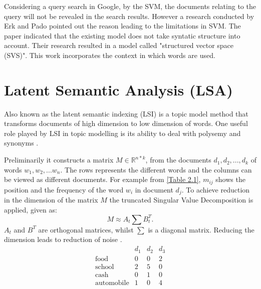 Considering a query search in Google, by the SVM, the documents relating to the query will not be revealed in the search results. However a research conducted by Erk and Pado pointed out the reason leading to the limitations in SVM.
The paper indicated that the existing model does not take syntatic structure into account. Their research resulted in a model called "structured vector space (SVS)". This work incorporates the context in which words are used.
%

\section{Latent Semantic Analysis (LSA)}
\begin{flushleft}
Also known as the latent semantic indexing (LSI) is a topic model method
that transforms documents of high dimension to low dimension of words. One useful role played by LSI in topic modelling is its ability to deal with polysemy and synonyms \cite{deerwester1990indexing}.
\end{flushleft} 
Preliminarily it constructs a matrix $M\in \mathbb{R}^{n*k}$, from the documents $d_1, d_2,..., d_k$ of words $w_1, w_2, ... w_n$. The rows represents the different words and the columns can be viewed as different documents.
For example from \eqref{Table 2.1}, $m_{ij}$ shows the position and the frequency of the word $w_i$ in document $d_j$.
To achieve reduction in the dimension of the matrix $M$ the truncated Singular Value Decomposition is applied, given as:
$$M\approx A_t \sum B^{T}_t.$$
$A_t$ and $B^T$ are orthogonal matrices, whilst $ \sum$ is a diagonal matrix.
Reducing the dimension leads to reduction of noise \cite{deerwester1990indexing}.
$$\begin{array}{cccc}
 &d_1 & d_2 &d_3 \\ 
 \text{food} & 0 & 0 & 2 \\ 
 \text{school} & 2 & 5 & 0 \\ 
 \text{cash} & 0 & 1 & 0 \\ 
 \text{automobile} & 1 & 0 & 4
  \end{array} $$
